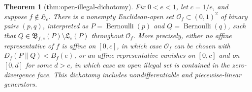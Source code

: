 \documentclass{article}
\newtheorem{theorem}{Theorem}
\begin{document}
\begin{theorem}[thm:open-illegal-dichotomy]\label{thm:open-illegal-dichotomy}
Fix \(0<e<1\), let \(c=1/e\), and suppose \(f\notin\mathfrak H_c\). There is a nonempty Euclidean-open set \(\mathcal O_f\subset(0,1)^2\) of binary pairs \((p,q)\), interpreted as \(P=\operatorname{Bernoulli}(p)\) and \(Q=\operatorname{Bernoulli}(q)\), such that \(Q\in\mathfrak B_{f,e}(P)\setminus\mathfrak L_e(P)\) throughout \(\mathcal O_f\). More precisely, either no affine representative of \(f\) is affine on \([0,c]\), in which case \(\mathcal O_f\) can be chosen with \(D_f(P\|Q)<B_f(e)\), or an affine representative vanishes on \([0,c]\) and on \([0,d]\) for some \(d>c\), in which case an open illegal set is contained in the zero-divergence face. This dichotomy includes nondifferentiable and piecewise-linear generators.
\end{theorem}
\end{document}

